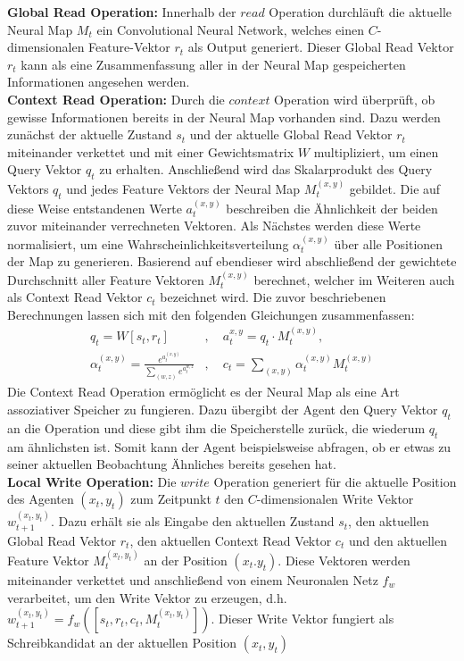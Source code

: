 \textbf{Global Read Operation:} Innerhalb der $read$ Operation durchläuft die aktuelle Neural Map $M_t$ ein Convolutional Neural Network, welches einen $C$-dimensionalen Feature-Vektor $r_t$ als Output generiert. Dieser Global Read Vektor $r_t$ kann als eine Zusammenfassung aller in der Neural Map gespeicherten Informationen angesehen werden. \\[0.1in]
\textbf{Context Read Operation:} Durch die $context$ Operation wird überprüft, ob gewisse Informationen bereits in der Neural Map vorhanden sind. Dazu werden zunächst der aktuelle Zustand $s_t$ und der aktuelle Global Read Vektor $r_t$ miteinander verkettet und mit einer Gewichtsmatrix $W$ multipliziert, um einen Query Vektor $q_t$ zu erhalten. Anschließend wird das Skalarprodukt des Query Vektors $q_t$ und jedes Feature Vektors der Neural Map $M_t^{(x,y)}$ gebildet. Die auf diese Weise entstandenen Werte $a_t^{(x,y)}$ beschreiben die Ähnlichkeit der beiden zuvor miteinander verrechneten Vektoren. Als Nächstes werden diese Werte normalisiert, um eine Wahrscheinlichkeitsverteilung $\alpha_t^{(x,y)}$ über alle Positionen der Map zu generieren. Basierend auf ebendieser wird abschließend der gewichtete Durchschnitt aller Feature Vektoren $M_t^{(x,y)}$ berechnet, welcher im Weiteren auch als Context Read Vektor $c_t$ bezeichnet wird. Die zuvor beschriebenen Berechnungen lassen sich mit den folgenden Gleichungen zusammenfassen:
\begin{equation*}
  \begin{align*}
    q_t = W [s_t, r_t]&, \quad a_t^{x,y} = q_t \cdot M_t^{(x,y)}, \\
    \alpha_t^{(x,y)} = \frac{e^{a_t^{(x,y)}}}{\sum_{(w,z)} e^{a_t^{w,z}}}&, \quad c_t = \sum_{(x,y)} \alpha_t^{(x,y)} M_t^{(x,y)}
  \end{align*}
\end{equation*}
Die Context Read Operation ermöglicht es der Neural Map als eine Art assoziativer Speicher zu fungieren. Dazu übergibt der Agent den Query Vektor $q_t$ an die Operation und diese gibt ihm die Speicherstelle zurück, die wiederum $q_t$ am ähnlichsten ist. Somit kann der Agent beispielsweise abfragen, ob er etwas zu seiner aktuellen Beobachtung Ähnliches bereits gesehen hat. \\[0.1in]
\textbf{Local Write Operation:} Die $write$ Operation generiert für die aktuelle Position des Agenten $(x_t,y_t)$ zum Zeitpunkt $t$ den $C$-dimensionalen Write Vektor $w_{t+1}^{(x_t,y_t)}$. Dazu erhält sie als Eingabe den aktuellen Zustand $s_t$, den aktuellen Global Read Vektor $r_t$, den aktuellen Context Read Vektor $c_t$ und den aktuellen Feature Vektor $M_t^{(x_t,y_t)}$ an der Position $(x_t.y_t)$. Diese Vektoren werden miteinander verkettet und anschließend von einem Neuronalen Netz $f_w$ verarbeitet, um den Write Vektor zu erzeugen, d.h. $w_{t+1}^{(x_t,y_t)} = f_w([s_t, r_t, c_t, M_t^{(x_t,y_t)}])$. Dieser Write Vektor fungiert als Schreibkandidat an der aktuellen Position $(x_t, y_t)$ \\[0.1in]
